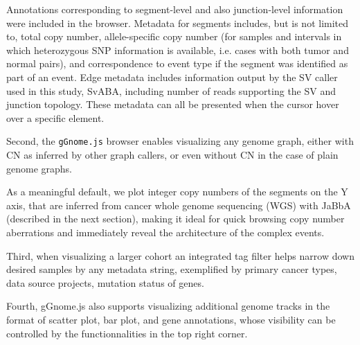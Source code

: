 \documentclass[phd,tocprelim]{cornell}
\begin{document}
Annotations corresponding to segment-level and also junction-level information were included in the browser. Metadata for segments includes, but is not limited to, total copy number, allele-specific copy number (for samples and intervals in which heterozygous SNP information is available, i.e. cases with both tumor and normal pairs), and correspondence to event type if the segment was identified as part of an event. Edge metadata includes information output by the SV caller used in this study, SvABA, including number of reads supporting the SV and junction topology. These metadata can all be presented when the cursor hover over a specific element.

\clearpage
Second, the \texttt{gGnome.js} browser enables visualizing any genome graph, either with CN as inferred by other graph callers, or even without CN in the case of plain genome graphs. 

As a meaningful default, we plot integer copy numbers of the segments on the Y axis, that are inferred from cancer whole genome sequencing (WGS) with JaBbA (described in the next section), making it ideal for quick browsing copy number aberrations and immediately reveal the architecture of the complex events. 


Third, when visualizing a larger cohort an integrated tag filter helps narrow down desired samples by any metadata string, exemplified by primary cancer types, data source projects, mutation status of genes.

Fourth, gGnome.js also supports visualizing additional genome tracks in the format of scatter plot, bar plot, and gene annotations, whose visibility can be controlled by the functionnalities in the top right corner.

\end{document}
